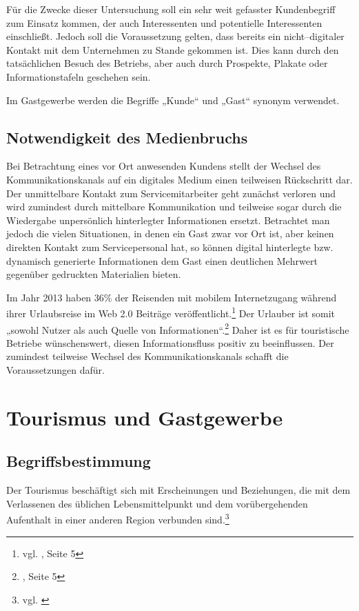 Für die Zwecke dieser Untersuchung soll ein sehr weit gefasster Kundenbegriff zum Einsatz kommen, der auch Interessenten und potentielle Interessenten einschließt. Jedoch soll die Voraussetzung gelten, dass bereits ein nicht--digitaler Kontakt mit dem Unternehmen zu Stande gekommen ist. Dies kann durch den tatsächlichen Besuch des Betriebs, aber auch durch Prospekte, Plakate oder Informationstafeln geschehen sein.

Im Gastgewerbe werden die Begriffe „Kunde“ und „Gast“ synonym verwendet.

\subsection{Notwendigkeit des Medienbruchs} %
\label{sec:medienbruch}

Bei Betrachtung eines vor Ort anwesenden Kundens stellt der Wechsel des Kommunikationskanals auf ein digitales Medium einen teilweisen Rückschritt dar. Der unmittelbare Kontakt zum Servicemitarbeiter geht zunächst verloren und wird zumindest durch mittelbare Kommunikation und teilweise sogar durch die Wiedergabe unpersönlich hinterlegter Informationen ersetzt.
Betrachtet man jedoch die vielen Situationen, in denen ein Gast zwar vor Ort ist, aber keinen direkten Kontakt zum Servicepersonal hat, so können digital hinterlegte bzw. dynamisch generierte Informationen dem Gast einen deutlichen Mehrwert gegenüber gedruckten Materialien bieten.

Im Jahr 2013 haben 36\% der Reisenden mit mobilem Internetzugang während ihrer Urlaubsreise im Web 2.0 Beiträge veröffentlicht.\footnote{vgl. \cite{reiseanalyse}, Seite 5} Der Urlauber ist somit „sowohl Nutzer als auch Quelle von Informationen“.\footnote{\cite{reiseanalyse}, Seite 5} Daher ist es für touristische Betriebe wünschenswert, diesen Informationsfluss positiv zu beeinflussen. Der zumindest teilweise Wechsel des Kommunikationskanals schafft die Voraussetzungen dafür.

\newpage
\section{Tourismus und Gastgewerbe} %
\label{sec:tourismusbranche}

\subsection{Begriffsbestimmung} %
\label{sub:begriffsbestimmung}
Der Tourismus beschäftigt sich mit Erscheinungen und Beziehungen, die mit dem Verlassenen des üblichen Lebensmittelpunkt und dem vorübergehenden Aufenthalt in einer anderen Region verbunden sind.\footnote{vgl. \cite{gabler:tourismus}}

